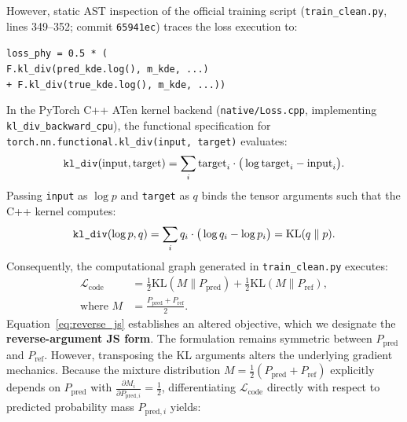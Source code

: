 However, static AST inspection of the official training script (\texttt{train\_clean.py}, lines 349--352; commit \texttt{65941ec}) traces the loss execution to:
\begin{center}
\small
\begin{minipage}{0.95\columnwidth}
\texttt{loss\_phy = 0.5 * (} \\
\hspace*{1em}\texttt{F.kl\_div(pred\_kde.log(), m\_kde, ...)} \\
\hspace*{1em}\texttt{+ F.kl\_div(true\_kde.log(), m\_kde, ...))}
\end{minipage}
\end{center}
In the PyTorch C++ ATen kernel backend (\texttt{native/Loss.cpp}, implementing \texttt{kl\_div\_backward\_cpu}), the functional specification for \texttt{torch.nn.functional.kl\_div(input, target)} evaluates:
\begin{equation}
\text{\texttt{kl\_div}}(\text{input}, \text{target}) = \sum_{i} \text{target}_i \cdot \big( \log \text{target}_i - \text{input}_i \big).
\label{eq:pytorch_kl}
\end{equation}
Passing \texttt{input} as $\log p$ and \texttt{target} as $q$ binds the tensor arguments such that the C++ kernel computes:
\begin{equation}
\text{\texttt{kl\_div}}(\log p, q) = \sum_{i} q_i \cdot \big( \log q_i - \log p_i \big) = \text{KL}(q \parallel p).
\label{eq:reverse_kl}
\end{equation}
Consequently, the computational graph generated in \texttt{train\_clean.py} executes:
\begin{equation}
\begin{aligned}
\mathcal{L}_{\text{code}} &= \frac{1}{2} \text{KL}\left(M \parallel P_{\text{pred}}\right) + \frac{1}{2} \text{KL}\left(M \parallel P_{\text{ref}}\right), \\
\text{where } M &= \frac{P_{\text{pred}} + P_{\text{ref}}}{2}.
\end{aligned}
\label{eq:reverse_js}
\end{equation}
Equation~\eqref{eq:reverse_js} establishes an altered objective, which we designate the \textbf{reverse-argument JS form}. The formulation remains symmetric between $P_{\text{pred}}$ and $P_{\text{ref}}$. However, transposing the KL arguments alters the underlying gradient mechanics. Because the mixture distribution $M = \frac{1}{2}(P_{\text{pred}} + P_{\text{ref}})$ explicitly depends on $P_{\text{pred}}$ with $\frac{\partial M_i}{\partial P_{\text{pred}, i}} = \frac{1}{2}$, differentiating $\mathcal{L}_{\text{code}}$ directly with respect to predicted probability mass $P_{\text{pred}, i}$ yields:
